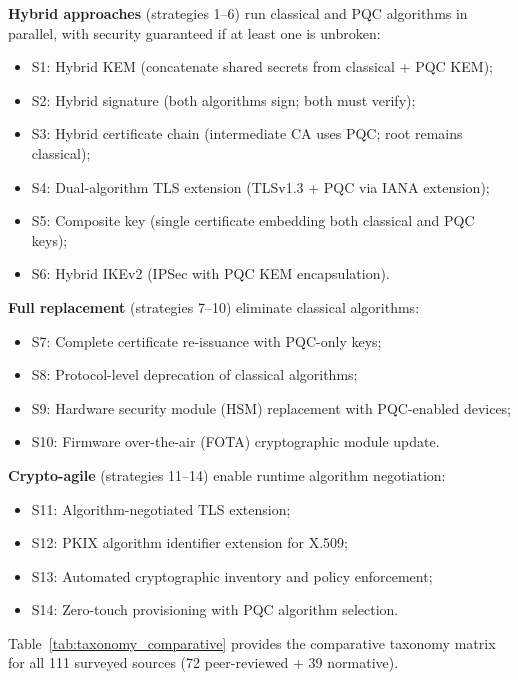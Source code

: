 \documentclass[journal]{IEEEtran}
\begin{document}
\textbf{Hybrid approaches} (strategies 1--6) run classical and PQC algorithms
in parallel, with security guaranteed if at least one is unbroken:
\begin{itemize}
  \item S1: Hybrid KEM (concatenate shared secrets from classical + PQC KEM);
  \item S2: Hybrid signature (both algorithms sign; both must verify);
  \item S3: Hybrid certificate chain (intermediate CA uses PQC; root remains classical);
  \item S4: Dual-algorithm TLS extension (TLSv1.3 + PQC via IANA extension);
  \item S5: Composite key (single certificate embedding both classical and PQC keys);
  \item S6: Hybrid IKEv2 (IPSec with PQC KEM encapsulation).
\end{itemize}

\textbf{Full replacement} (strategies 7--10) eliminate classical algorithms:
\begin{itemize}
  \item S7: Complete certificate re-issuance with PQC-only keys;
  \item S8: Protocol-level deprecation of classical algorithms;
  \item S9: Hardware security module (HSM) replacement with PQC-enabled devices;
  \item S10: Firmware over-the-air (FOTA) cryptographic module update.
\end{itemize}

\textbf{Crypto-agile} (strategies 11--14) enable runtime algorithm negotiation:
\begin{itemize}
  \item S11: Algorithm-negotiated TLS extension;
  \item S12: PKIX algorithm identifier extension for X.509;
  \item S13: Automated cryptographic inventory and policy enforcement;
  \item S14: Zero-touch provisioning with PQC algorithm selection.
\end{itemize}

Table~\ref{tab:taxonomy_comparative} provides the comparative taxonomy matrix
for all 111 surveyed sources (72 peer-reviewed + 39 normative).
\end{document}
